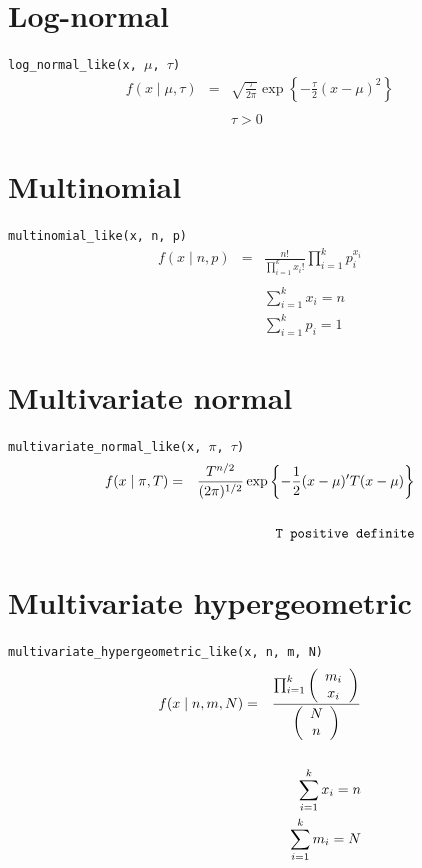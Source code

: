\documentclass[]{book}
\begin{document}
\section*{Log-normal}
\verb=log_normal_like(x, =$\mu$\verb=, =$\tau$\verb=)=
\begin{eqnarray*}
f(x \mid \mu, \tau) &=& \sqrt{\frac{\tau}{2\pi}} \exp\left\{ -\frac{\tau}{2} (x-\mu)^2 \right\}\\
\\
&& \tau > 0
\end{eqnarray*}

\section*{Multinomial}
\verb=multinomial_like(x, n, p)=
\begin{eqnarray*}
f(x \mid n, p) &=& \frac{n!}{\prod_{i=1}^k x_i!} \prod_{i=1}^k p_i^{x_i}\\
\\
&& \sum_{i=1}^k x_i=n \\
&& \sum_{i=1}^k p_i=1
\end{eqnarray*}

\section*{Multivariate normal}
\verb=multivariate_normal_like(x, =$\pi$\verb=, =$\tau$\verb=)=
\begin{eqnarray*}
f(x \mid \pi, T) &=& \frac{T^{n/2}}{(2\pi)^{1/2}} \exp\left\{ -\frac{1}{2} (x-\mu)^{\prime}T(x-\mu) \right\}\\
\\
&& \verb=T positive definite=
\end{eqnarray*}

\section*{Multivariate hypergeometric}
\verb=multivariate_hypergeometric_like(x, n, m, N)=
\begin{eqnarray*}
f(x \mid n, m, N) &=& \frac{{\huge \prod}_{i=1}^k \left(\begin{array}{c}m_i \\x_i\end{array}\right)}{\left(\begin{array}{c}N \\n\end{array}\right)} \\
\vspace{3cm}\\
&& \sum_{i=1}^k x_i = n\\
&& \sum_{i=1}^k m_i = N
\end{eqnarray*}
\end{document}
